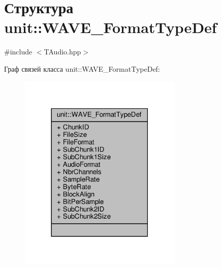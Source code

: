 \hypertarget{structunit_1_1_w_a_v_e___format_type_def}{}\section{Структура unit\+:\+:W\+A\+V\+E\+\_\+\+Format\+Type\+Def}
\label{structunit_1_1_w_a_v_e___format_type_def}


{\ttfamily \#include $<$T\+Audio.\+hpp$>$}



Граф связей класса unit\+:\+:W\+A\+V\+E\+\_\+\+Format\+Type\+Def\+:\nopagebreak
\begin{figure}[H]
\begin{center}
\leavevmode
\includegraphics[width=222pt]{structunit_1_1_w_a_v_e___format_type_def__coll__graph}
\end{center}
\end{figure}
